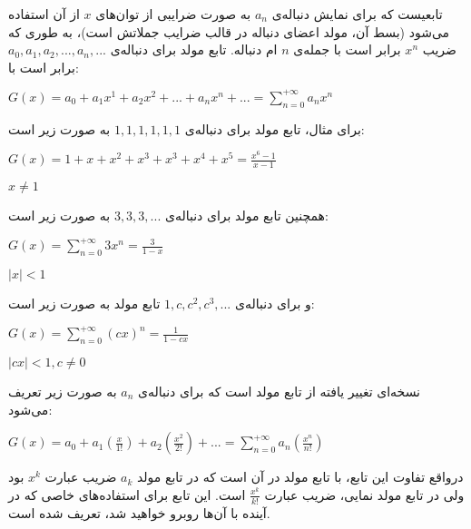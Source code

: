 
\begin{definition}
    تابعیست که برای نمایش دنباله‌ی 
    $a_{n}$ 
    به صورت ضرایبی از توان‌های 
    $x$
    از آن استفاده می‌شود (بسط آن، مولد اعضای دنباله در قالب ضرایب جملاتش است)، به طوری که ضریب 
    $x^{n}$
    برابر است با جمله‌ی
    $n$
    ام دنباله. تابع مولد برای دنباله‌ی 
    $a_{0}, a_{1}, a_{2}, ..., a_{n}, ... $
    برابر است با:
    \begin{center}
        $G(x)= a_{0} + a_{1}x^{1} + a_{2}x^{2} + ... + a_{n}x^{n} + ... = \sum			\limits_{n=0}^{+\infty} a_{n}x^{n}$
    \end{center}
\end{definition}

برای مثال،
تابع مولد برای دنباله‌ی 
$1, 1, 1, 1, 1, 1$ 
به صورت زیر است:
\begin{center}
    $G(x)= 1 + x + x^2 + x^3 + x^3 + x^4 + x^5 = \frac{x^6-1}{x-1}$
    
    $x \neq 1$	
\end{center}

همچنین
تابع مولد برای دنباله‌ی 
$3, 3, 3, ...$
به صورت زیر است: 
\begin{center}
    $G(x)= \sum\limits_{n=0}^{+\infty} 3x^{n} = \frac{3}{1-x}$
    
    $|x| < 1$	
\end{center}

و برای دنباله‌ی 
$1, c, c^2, c^3, ...$
تابع مولد به صورت زیر است: 
\begin{center}
    $G(x)= \sum\limits_{n=0}^{+\infty} (cx)^{n} = \frac{1}{1-cx}$
            
    $|cx| < 1 , c \neq 0$
\end{center}









\begin{definition}
    نسخه‌ای تغییر یافته از تابع مولد است که
    برای دنباله‌ی 
    $a_{n}$
    به صورت زیر تعریف می‌شود:
    \begin{center}
      $G(x)= a_{0} + a_{1}(\frac{x}{1!}) + a_{2}(\frac{x^{2}}{2!}) + ... = 
      \sum\limits_{n=0}^{+\infty} a_{n}(\frac{x^{n}}{n!})$
    \end{center}
\end{definition}

درواقع تفاوت این تابع، با تابع مولد در آن است که در تابع مولد
$a_k$
ضریب عبارت
$x^k$
بود ولی در تابع مولد نمایی، ضریب عبارت
$\frac{x^k}{k!}$
است.
این تابع برای
استفاده‌های خاصی که در آینده با آن‌ها روبرو خواهید شد،
تعریف شده است.

